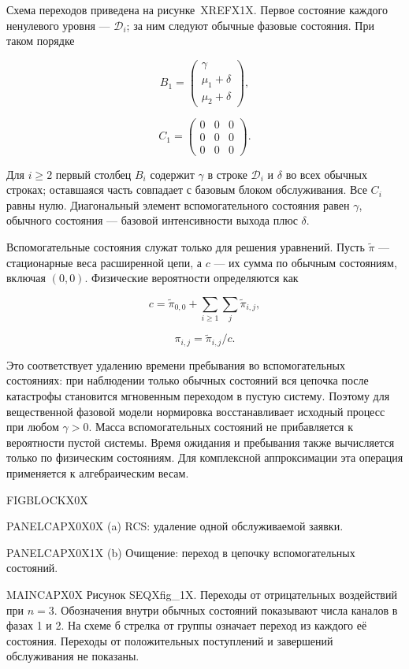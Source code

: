 Схема переходов приведена на рисунке~XREFX1X. Первое состояние каждого ненулевого уровня --- \(\mathcal{D}_i\); за ним следуют обычные фазовые состояния. При таком порядке


\[B_1=\begin{pmatrix}\gamma\\\mu_1+\delta\\\mu_2+\delta\end{pmatrix},\]

\[C_1=\begin{pmatrix}0&0&0\\0&0&0\\0&0&0\end{pmatrix}.\]


Для \(i\ge2\) первый столбец \(B_i\) содержит \(\gamma\) в строке \(\mathcal{D}_i\) и \(\delta\) во всех обычных строках; оставшаяся часть совпадает с базовым блоком обслуживания. Все \(C_i\) равны нулю. Диагональный элемент вспомогательного состояния равен \(\gamma\), обычного состояния --- базовой интенсивности выхода плюс \(\delta.\)

Вспомогательные состояния служат только для решения уравнений. Пусть \(\widetilde\pi\) --- стационарные веса расширенной цепи, а \(c\) --- их сумма по обычным состояниям, включая \((0,0).\) Физические вероятности определяются как


\[c=\widetilde\pi_{0,0}+\sum_{i\ge1}\sum_j\widetilde\pi_{i,j},\]

\[\pi_{i,j}=\widetilde\pi_{i,j}/c.\]


Это соответствует удалению времени пребывания во вспомогательных состояниях: при наблюдении только обычных состояний вся цепочка после катастрофы становится мгновенным переходом в пустую систему. Поэтому для вещественной фазовой модели нормировка восстанавливает исходный процесс при любом \(\gamma>0.\) Масса вспомогательных состояний не прибавляется к вероятности пустой системы. Время ожидания и пребывания также вычисляется только по физическим состояниям. Для комплексной аппроксимации эта операция применяется к алгебраическим весам.

\noindent FIGBLOCKX0X\par

\noindent PANELCAPX0X0X (a) RCS: удаление одной обслуживаемой заявки.\par

\noindent PANELCAPX0X1X (b) Очищение: переход в цепочку вспомогательных состояний.\par

\noindent MAINCAPX0X Рисунок SEQXfig_1X. Переходы от отрицательных воздействий при \(n=3.\) Обозначения внутри обычных состояний показывают числа каналов в фазах 1 и 2. На схеме б стрелка от группы означает переход из каждого её состояния. Переходы от положительных поступлений и завершений обслуживания не показаны.\par

